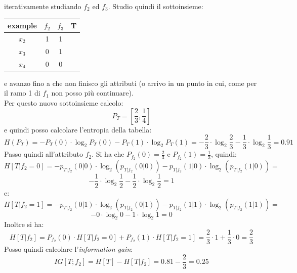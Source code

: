 \begin{esercizio}
  iterativamente studiando $f_2$ ed $f_3$. Studio quindi il sottoinsieme: 
  \begin{table}[H]
    \centering
    \begin{tabular}{c|c|c|c}
      example  & $f_2$ & $f_3$ & T\\
      \hline
      $x_2$ & 1 & 1 & \color{red}{0}\\
      $x_3$ & 0 & 1 & \color{darkgreen}{1}\\
      $x_4$ & 0 & 0 & \color{red}{0}\\
    \end{tabular}
  \end{table}
  e avanzo fino a che non finisco gli attributi (o arrivo in un punto in cui,
  come per il ramo 1 di $f_1$ non posso più continuare).\\
  Per questo nuovo sottoinsieme calcolo:
  \[P_T=\left[\frac{2}{3},\frac{1}{4}\right]\]
  e quindi posso calcolare l'entropia della tabella:
  \[H(P_T)=-P_T(0)\cdot \log_2 P_T(0)-P_T(1)\cdot\log_2
    P_T(1)=-\frac{2}{3}\cdot\log_2\frac{2}{3}-\frac{1}{3}\cdot\log_2
    \frac{1}{3}= 0.91\]
  Passo quindi all'attributo $f_2$. Si ha che $P_{f_2}(0)=\frac{2}{3}$ e
  $P_{f_2}(1)=\frac{1}{3}$, quindi:
  \[H[T|f_2=0]=-p_{T|f_2}(0|0)\cdot \log_2(p_{T|f_2}(0|0))-p_{T|f_2}(1|0)\cdot
    \log_2(p_{T|f_2}(1|0))=\]
  \[-\frac{1}{2}\cdot \log_2 \frac{1}{2}-\frac{1}{2}\cdot \log_2 \frac{1}{2}=1\]
  e:
  \[H[T|f_2=1]=-p_{T|f_2}(0|1)\cdot \log_2(p_{T|f_2}(0|1))-p_{T|f_2}(1|1)\cdot
    \log_2(p_{T|f_2}(1|1))=\]
  \[-0\cdot \log_2 0-1\cdot \log_2 1=0\]
  Inoltre si ha:
  \[H[T|f_2]=P_{f_2}(0)\cdot H[T|f_2=0]+P_{f_2}(1)\cdot
    H[T|f_2=1]=\frac{2}{3}\cdot 1+\frac{1}{3}\cdot 0=\frac{2}{3}\]
  Posso quindi calcolare l'\textit{information gain}:
  \[IG[T;f_2]=H[T]-H[T|f_2]=0.81-\frac{2}{3}=0.25\]
  

\end{esercizio}
